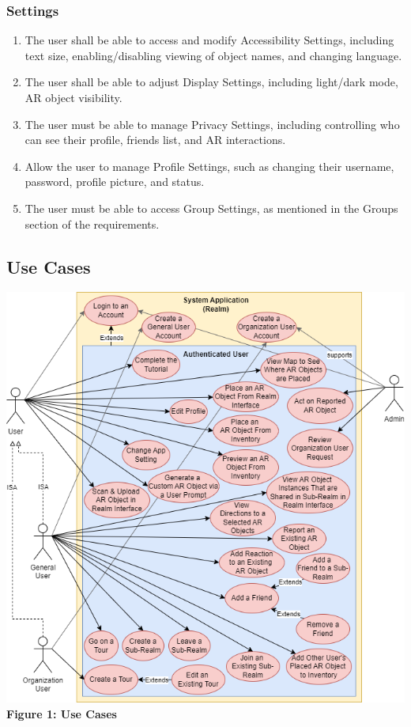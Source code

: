 \documentclass{article}
\begin{document}
\subsubsection{Settings}
\label{ssub:settings}
\begin{enumerate}[align=left, label=\textbf{S-FR\arabic*:}]
    \item The user shall be able to access and modify Accessibility Settings, including text size, enabling/disabling viewing of object names, and changing language.
    \item The user shall be able to adjust Display Settings, including light/dark mode, AR object visibility.
    \item The user must be able to manage Privacy Settings, including controlling who can see their profile, friends list, and AR interactions.
    \item Allow the user to manage Profile Settings, such as changing their username, password, profile picture, and status.
    \item The user must be able to access Group Settings, as mentioned in the Groups section of the requirements.
\end{enumerate}

\subsection{Use Cases}
\label{sub:use_cases}

\begin{center}
    \includegraphics[scale=0.5]{use_cases.png}\\ 
    \textbf{Figure 1: Use Cases}
\end{center}
\end{document}
